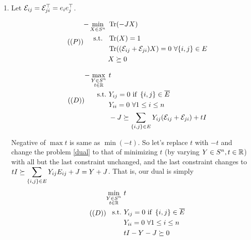 \soln
\begin{enumerate}[leftmargin=*]
\item Let ${\mathcal{E}}_{ij} = {\mathcal{E}}_{ji}^{\top} = e_{i}e_{j}^{\top}$.

\begin{minipage}{.5\textwidth}
\begin{equation}\tag{($P$)}\label{primal}
\begin{aligned}
-\min_{X \in S^{n}}&~ \operatorname{Tr}(-JX) \\
\text { s.t. } &~\operatorname{Tr}(X) = 1\\
&~\operatorname{Tr}(({\mathcal{E}}_{ij}+{\mathcal{E}}_{ji})X) = 0 ~\forall\{i, j\} \in E \\
&~X \succeq 0 
\end{aligned}
\end{equation}      
\end{minipage}\hfill
\begin{minipage}{.5\textwidth}
\begin{equation}\tag{($D$)}\label{dual}
\begin{aligned}
-\max_{\substack{Y\in S^{n}\\ t\in \mathbb{R}}}&~ t\\
\text{s.t.}&~ Y_{ij} = 0\text{ if } \left\{i,j\right\}\in\overline E\\
&~ Y_{ii} = 0 ~\forall 1 \le i\le n\\
&~ -J \succeq \sum_{\left\{i,j\right\}\in E} Y_{ij}({\mathcal{E}}_{ij}+{\mathcal{E}}_{ji}) + t I
\end{aligned}
\end{equation}      
\end{minipage}

Negative of $\max t$ is same as $\min (-t)$. So let's replace $t$ with $-t$ and change the problem \ref{dual} to that of minimizing $t$ (by varying $Y\in S^{n}, t\in \mathbb{R}$) with all but the last constraint unchanged, and the last constraint changes to $\displaystyle tI \succeq \sum_{\left\{i,j\right\}\in E} Y_{ij}E_{ij} + J = Y+J$. That is, our dual is simply 
\begin{equation}\tag{($D$)}\label{dual}
\begin{aligned}
\min_{\substack{Y\in S^{n}\\ t\in \mathbb{R}}}&~ t\\
\text{s.t.}&~ Y_{ij} = 0\text{ if } \left\{i,j\right\}\in\overline E\\
&~ Y_{ii} = 0 ~\forall 1 \le i\le n\\
&~ tI - Y- J\succeq 0
\end{aligned}
\end{equation} 


\end{enumerate}
